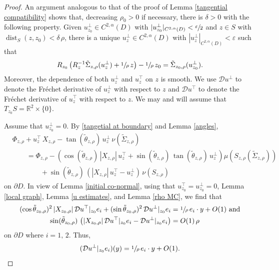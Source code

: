 \documentclass[11pt]{amsart}
\begin{document}
\begin{proof}
	
An argument analogous to that of the proof of Lemma \ref{tangential compatibility} shows that, decreasing $\rho_0>0$ if necessary, there is $\delta>0$ with the following property. Given  $u_{z_0}^\perp\in C^{2,\alpha}(D)$ with $|u_{z_0}^\perp|_{C^{2,\alpha}(D)}<\sfrac{\varepsilon}{2}$ and $z\in S$ with $\operatorname{dist}_{S}(z,z_0)<\delta\,\rho$, there is a unique $u_z^\perp \in C^{2,\alpha}(D)$ with  $| u_z^\perp|_{C^{2,\alpha}(D)}<\varepsilon$ such that 
	\begin{align*}   
	R_{z_0}\left(R_z^{-1}\tilde \Sigma_{z,\rho}( u_z^\perp)+\sfrac1\rho\,z\right)-\sfrac1\rho\,z_0=\tilde \Sigma_{z_0,\rho}(u_{z_0}^\perp).
	\end{align*}  Moreover, the dependence of both $u^\perp_z$  and $u^\top_z$ on $z$ is smooth. We use $\mathcal{D}u^\perp$ to denote the Fr\'echet derivative of $u_z^\perp$ with respect to $z$ and  $\mathcal{D}u^\top$ to denote the Fr\'echet derivative of $u_z^\top$ with respect to $z$. 
We may and will assume that $T_{z_0}S=\mathbb{R}^2\times \{0\}$.

Assume that $u_{z_0}^\perp=0$. By \eqref{tangetial at boundary} and Lemma \ref{angles}, 
\begin{equation*} 
\begin{aligned} 
	&\Phi_{z,\rho}+u_z^\top\, X_{z,\rho}-\tan(\tilde \theta_{z,\rho})\,u_z^\perp\,\nu(\tilde \Sigma_{z,\rho})
	\\
&\qquad=\Phi_{z,\rho}-\left(\cos(\tilde \theta_{z,\rho})\,|X_{z,\rho}|\,u^\top_z+\sin(\tilde \theta_{z,\rho})\,\tan(\tilde \theta_{z,\rho})\,u^\perp_z\right)\mu(S_{z,\rho}(\tilde \Sigma_{z,\rho}))
\\&\qquad\qquad  +\sin(\tilde \theta_{z,\rho})\,\left(|X_{z,\rho}|\,u_z^\top-u_z^\perp\right)\,\nu(S_{z,\rho})
\end{aligned} 
\end{equation*}
on $\partial D$.
 In view of Lemma \ref{initial co-normal}, using that $u^\top_{z_0}=u^\perp_{z_0}=0$, Lemma \ref{local graph}, Lemma \ref{u estimates}, and Lemma \ref{rho MC},  we find that 
\begin{equation*} 
\begin{aligned} 
(\cos\tilde \theta_{z_0,\rho})^2\,|X_{z_0,\rho}|\,\mathcal{D} u^\top|_{z_0} e_i
+(\sin\tilde \theta_{z_0,\rho})^2\,\mathcal{D} u^\perp|_{z_0} e_i&=
\sfrac{1}\rho\,e_i\cdot y+O(1)
\text{ and}\\
\sin(\tilde \theta_{z_0,\rho})\,\left(|X_{z_0,\rho}|\,\mathcal{D} u^\top|_{z_0} e_i-\mathcal{D} u^\perp|_{z_0} e_i\right)&=O(1)\,\rho
\end{aligned}
\end{equation*}
on $\partial D$ where $i=1,\,2$. Thus,
\begin{align}
	\label{variation} (\mathcal{D} u^\perp|_{z_0} e_i)(y)=\sfrac{1}{\rho}\,e_i\cdot y+O(1).
\end{align}


\end{proof}
\end{document}

